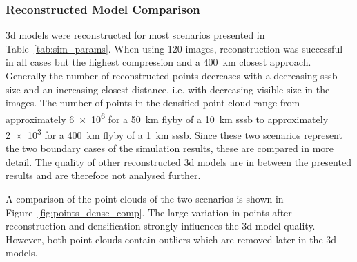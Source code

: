 \subsubsection{Reconstructed Model Comparison}
\Gls{3d} models were reconstructed for most scenarios presented in Table~\ref{tab:sim_params}. When using \SI{120}{} images, reconstruction was successful in all cases but the highest compression and a \SI{400}{\kilo\meter} closest approach.
Generally the number of reconstructed points decreases with a decreasing \gls{sssb} size and an increasing closest distance, i.e. with decreasing visible size in the images.
The number of points in the densified point cloud range from approximately \SI{6e6}{} for a \SI{50}{\kilo\meter} flyby of a \SI{10}{\kilo\meter} \gls{sssb} to approximately \SI{2e3}{} for a \SI{400}{\kilo\meter} flyby of a \SI{1}{\kilo\meter} \gls{sssb}. Since these two scenarios represent the two boundary cases of the simulation results, these are compared in more detail. The quality of other reconstructed \gls{3d} models are in between the presented results and are therefore not analysed further.

A comparison of the point clouds of the two scenarios is shown in Figure~\ref{fig:points_dense_comp}. The large variation in points after reconstruction and densification strongly influences the \gls{3d} model quality. However, both point clouds contain outliers which are removed later in the \gls{3d} models.

